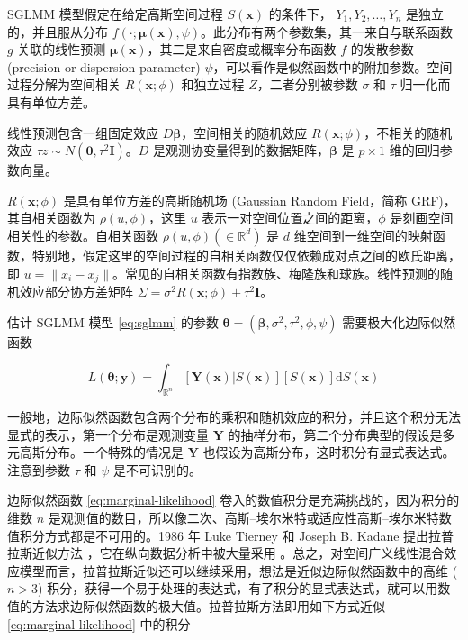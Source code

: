 \documentclass[12pt,a4paper,UTF8,twoside]{book}
\theoremstyle{definition}
\theoremstyle{definition}
\theoremstyle{definition}
\theoremstyle{remark}
\begin{document}
SGLMM 模型假定在给定高斯空间过程 \(S(\mathbf{x})\) 的条件下，
\(Y_1,Y_2,\ldots,Y_n\) 是独立的，并且服从分布
\(f(\cdot;\boldsymbol{\mu(x)},\psi)\)。此分布有两个参数集，其一来自与联系函数
\(g\) 关联的线性预测
\(\boldsymbol{\mu(x)}\)，其二是来自密度或概率分布函数 \(f\) 的发散参数
(precision or dispersion parameter)
\(\psi\)，可以看作是似然函数中的附加参数。空间过程分解为空间相关
\(R(\mathbf{x};\phi)\) 和独立过程 \(Z\)，二者分别被参数 \(\sigma\) 和
\(\tau\) 归一化而具有单位方差。

线性预测包含一组固定效应 \(D\boldsymbol{\beta}\)，空间相关的随机效应
\(R(\mathbf{x};\phi)\)，不相关的随机效应
\(\tau z \sim N(\mathbf{0},\tau^2\mathbf{I})\)。\(D\)
是观测协变量得到的数据矩阵，\(\boldsymbol{\beta}\) 是 \(p \times 1\)
维的回归参数向量。

\(R(\mathbf{x};\phi)\) 是具有单位方差的高斯随机场 (Gaussian Random
Field，简称 GRF)，其自相关函数为 \(\rho(u,\phi)\)，这里 \(u\)
表示一对空间位置之间的距离，\(\phi\) 是刻画空间相关性的参数。自相关函数
\(\rho(u,\phi) (\in \mathbb{R}^d)\) 是 \(d\)
维空间到一维空间的映射函数，特别地，假定这里的空间过程的自相关函数仅仅依赖成对点之间的欧氏距离，即
\(u =\|x_i - x_j\|\)。常见的自相关函数有指数族、梅隆族和球族。线性预测的随机效应部分协方差矩阵
\(\Sigma = \sigma^2 R(\mathbf{x};\phi) + \tau^2\mathbf{I}\)。

估计 SGLMM 模型 \eqref{eq:sglmm} 的参数
\(\boldsymbol{\theta} = (\boldsymbol{\beta},\sigma^2,\tau^2,\phi,\psi)\)
需要极大化边际似然函数

\begin{equation}
L(\boldsymbol{\theta};\mathbf{y}) = \int_{\mathbb{R}^n} [\mathbf{Y(x)}|S(\mathbf{x})][S(\mathbf{x})]\mathrm{d}S(\mathbf{x}) \label{eq:marginal-likelihood}
\end{equation}

一般地，边际似然函数包含两个分布的乘积和随机效应的积分，并且这个积分无法显式的表示，第一个分布是观测变量
\(\mathbf{Y}\)
的抽样分布，第二个分布典型的假设是多元高斯分布。一个特殊的情况是
\(\mathbf{Y}\) 也假设为高斯分布，这时积分有显式表达式。注意到参数
\(\tau\) 和 \(\psi\) 是不可识别的。

边际似然函数 \eqref{eq:marginal-likelihood}
卷入的数值积分是充满挑战的，因为积分的维数 \(n\)
是观测值的数目，所以像二次、高斯--埃尔米特或适应性高斯--埃尔米特数值积分方式都是不可用的。1986
年 Luke Tierney 和 Joseph B. Kadane 提出拉普拉斯近似方法
\citep{Tierney1986}，它在纵向数据分析中被大量采用
\citep{Diggle2002Analysis}。总之，对空间广义线性混合效应模型而言，拉普拉斯近似还可以继续采用，想法是近似边际似然函数中的高维
(\(n > 3\))
积分，获得一个易于处理的表达式，有了积分的显式表达式，就可以用数值的方法求边际似然函数的极大值。拉普拉斯方法即用如下方式近似
\eqref{eq:marginal-likelihood} 中的积分
\end{document}
